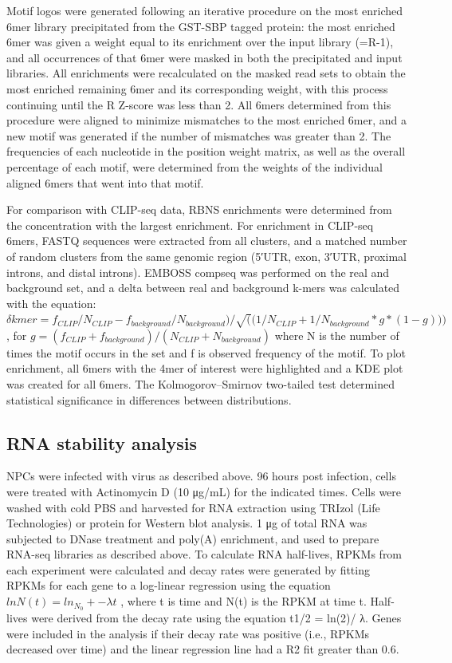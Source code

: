 Motif logos were generated following an iterative procedure on the most enriched 6mer library precipitated from the GST-SBP tagged protein: the most enriched 6mer was given a weight equal to its enrichment over the input library (=R-1), and all occurrences of that 6mer were masked in both the precipitated and input libraries. All enrichments were recalculated on the masked read sets to obtain the most enriched remaining 6mer and its corresponding weight, with this process continuing until the R Z-score was less than 2. All 6mers determined from this procedure were aligned to minimize mismatches to the most enriched 6mer, and a new motif was generated if the number of mismatches was greater than 2. The frequencies of each nucleotide in the position weight matrix, as well as the overall percentage of each motif, were determined from the weights of the individual aligned 6mers that went into that motif.


For comparison with CLIP-seq data, RBNS enrichments were determined from the concentration with the largest enrichment. For enrichment in CLIP-seq 6mers, FASTQ sequences were extracted from all clusters, and a matched number of random clusters from the same genomic region (5′UTR, exon, 3′UTR, proximal introns, and distal introns). EMBOSS compseq was performed on the real and background set, and a delta between real and background k-mers was calculated with the equation:
$\delta kmer = {f_{CLIP}/N_{CLIP}} - {f_{background}}/N_{background})/ {\sqrt((1/N_{CLIP} + 1/ N_{background}}* g * (1-g)))$, for $g = {(f_{CLIP}+f_{background})/(N_{CLIP}+N_{background} )}$
where N is the number of times the motif occurs in the set and f is observed frequency of the motif. To plot enrichment, all 6mers with the 4mer of interest were highlighted and a KDE plot was created for all 6mers. The Kolmogorov–Smirnov two-tailed test determined statistical significance in differences between distributions.

\subsection{RNA stability analysis}
NPCs were infected with virus as described above. 96 hours post infection, cells were treated with Actinomycin D (10 μg/mL) for the indicated times. Cells were washed with cold PBS and harvested for RNA extraction using TRIzol (Life Technologies) or protein for Western blot analysis. 1 μg of total RNA was subjected to DNase treatment and poly(A) enrichment, and used to prepare RNA-seq libraries as described above. To calculate RNA half-lives, RPKMs from each experiment were calculated and decay rates were generated by fitting RPKMs for each gene to a log-linear regression using the equation  $ln⁡{N(t)}=ln_{N_0} + -\lambda t$ , where t is time and N(t) is the RPKM at time t. Half-lives were derived from the decay rate using the equation t1/2 = ln(2)/ λ. Genes were included in the analysis if their decay rate was positive (i.e., RPKMs decreased over time) and the linear regression line had a R2 fit greater than 0.6.

